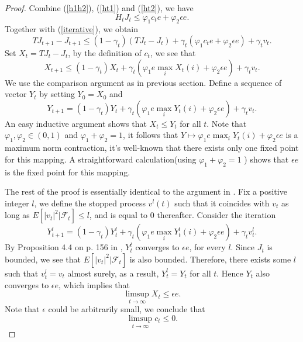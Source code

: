 \documentclass[12pt,a4paper]{amsart}
\numberwithin{equation}{section}
\theoremstyle{plain}
\theoremstyle{definition}
\begin{document}
\begin{proof}
	Combine (\ref{h1h2}), (\ref{ht1}) and (\ref{ht2}), we have
	\begin{equation} \label{h}
		H_t J_t \le  \varphi_1 c_t e + \varphi_2 \epsilon e. 
	\end{equation}
	Together with (\ref{iterative}), we obtain
	\begin{equation}
		TJ_{t+1} - J_{t+1} \le (1-\gamma_t) \left(TJ_t - J_t\right) + \gamma_t (\varphi_1 c_t e + \varphi_2 \epsilon e) + \gamma_t v_t. 
	\end{equation}
	Set $X_t = TJ_t - J_t $, by the definition of $c_t$, we see that
	$$
	X_{t+1 } \le (1-\gamma_t) X_t + \gamma_t (\varphi_1 e \max_{i} X_t(i)  + \varphi_2 \epsilon e) + \gamma_t v_t. 
	$$
	We use the comparison argument as in previous section. Define a sequence of vector $Y_t$ by setting $Y_0 = X_0$ and 
	$$
	Y_{t+1 } = (1-\gamma_t) Y_t + \gamma_t (\varphi_1 e \max_{i}  Y_t(i)  + \varphi_2 \epsilon e) + \gamma_t v_t.
	$$
	An easy inductive argument shows that $X_t \le Y_t$ for all $t$. Note that $\varphi_1, \varphi_2 \in (0, 1)$ and $\varphi_1 + \varphi_2 = 1$, it follows that $Y \mapsto \varphi_1 e \max_{i}  Y_t(i)  + \varphi_2 \epsilon e $ is a maximum norm contraction, it's well-known that there exists only one fixed point for this mapping. A straightforward calculation(using $\varphi_1 + \varphi_2 = 1$ ) shows that $\epsilon e$ is the fixed point for this mapping. 
	
	The rest of the proof is essentially identical to the argument in \cite{Ts03}. Fix a positive integer $l$, we define the stopped process $v^l(t)$ such that it coincides with $v_t$ as long as $E\left[|v_t|^2 | \mathcal{F}_t\right] \le l$, and is equal to 0 thereafter. Consider the iteration
	$$
	Y_{t+1}^l = (1-\gamma_t) Y_t^l + \gamma_t (\varphi_1 e \max_{i} Y_t^l(i) + \varphi_2 \epsilon e) + \gamma_t v_t^l. 
	$$
	By Proposition 4.4 on p. 156 in \cite{BertsekasTsitsiklis96}, $Y_t^l$ converges to $\epsilon e$, for every $l$. Since $J_t$ is bounded, we see that $E\left[|v_t|^2 | \mathcal{F}_t\right] $ is also bounded.  Therefore, there exists some $l$ such that $v_t^l = v_t$ almost surely, as a result, $Y_t^l = Y_t$ for all $t$. Hence $Y_t$ also converges to $\epsilon e$, which implies that
	$$
	\limsup_{t \to \infty} X_t \le \epsilon e. 
 	$$ 
 	Note that $\epsilon$ could be arbitrarily small, we conclude that
 	$$
 	\limsup_{t \to \infty} c_t \le  0. 
 	$$ 
\end{proof}
\end{document}
